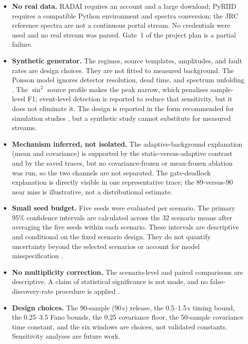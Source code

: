 \documentclass[11pt]{article}
\begin{document}
\begin{itemize}
  \item \textbf{No real data.} RADAI requires an account and a large download; PyRIID requires a compatible Python environment and spectra conversion; the JRC reference spectra are not a continuous portal stream. No credentials were used and no real stream was parsed. Gate~1 of the project plan is a partial failure.
  \item \textbf{Synthetic generator.} The regimes, source templates, amplitudes, and fault rates are design choices. They are not fitted to measured background. The Poisson model ignores detector resolution, dead time, and spectrum unfolding \citep{knoll2010radiation}. The $\sin^2$ source profile makes the peak narrow, which penalises sample-level F1; event-level detection is reported to reduce that sensitivity, but it does not eliminate it. The design is reported in the form recommended for simulation studies \citep{morris2019simulation}, but a synthetic study cannot substitute for measured streams.
  \item \textbf{Mechanism inferred, not isolated.} The adaptive-background explanation (mean and covariance) is supported by the static-versus-adaptive contrast and by the saved traces, but no covariance-frozen or mean-frozen ablation was run, so the two channels are not separated. The gate-deadlock explanation is directly visible in one representative trace; the 89-versus-90 near miss is illustrative, not a distributional estimate.
  \item \textbf{Small seed budget.} Five seeds were evaluated per scenario. The primary 95\% confidence intervals are calculated across the 32 scenario means after averaging the five seeds within each scenario. These intervals are descriptive and conditional on the fixed scenario design. They do not quantify uncertainty beyond the selected scenarios or account for model misspecification \citep{greenland2016statistical}.
  \item \textbf{No multiplicity correction.} The scenario-level and paired comparisons are descriptive. A claim of statistical significance is not made, and no false-discovery-rate procedure is applied \citep{benjamini1995controlling}.
  \item \textbf{Design choices.} The 90-sample (90\,s) release, the 0.5--1.5\,s timing bound, the 0.25--3.5 Fano bounds, the 0.25 covariance floor, the 50-sample covariance time constant, and the six windows are choices, not validated constants. Sensitivity analyses are future work.

\end{itemize}
\end{document}
